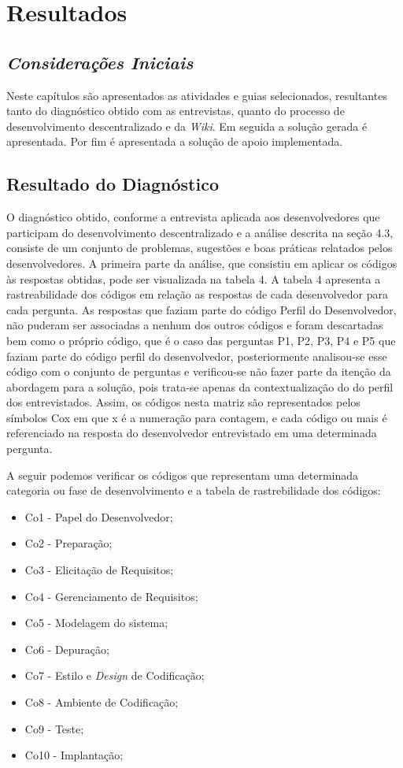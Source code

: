 \chapter[Resultados]{Resultados}

\section{\textit{Considerações Iniciais}}

Neste capítulos são apresentados as atividades e guias selecionados, resultantes tanto do diagnóstico obtido com as entrevistas, quanto do processo de desenvolvimento descentralizado e da \textit{Wiki}. Em seguida a solução gerada é apresentada. Por fim é apresentada a solução de apoio implementada.

\section{Resultado do Diagnóstico}

O diagnóstico obtido, conforme a entrevista aplicada aos desenvolvedores que participam do desenvolvimento descentralizado e a análise descrita na seção 4.3, consiste de um conjunto de problemas, sugestões e boas práticas relatados pelos desenvolvedores. A primeira parte da análise, que consistiu em aplicar os códigos às respostas obtidas, pode ser visualizada na tabela 4. A tabela 4 apresenta a rastreabilidade dos códigos em relação as respostas de cada desenvolvedor para cada pergunta. As respostas que faziam parte do código Perfil do Desenvolvedor, não puderam ser associadas a nenhum dos outros códigos e foram descartadas bem como o próprio código, que é o caso das perguntas P1, P2, P3, P4 e P5 que faziam parte do código perfil do desenvolvedor, posteriormente analisou-se esse código com o conjunto de perguntas e verificou-se não fazer parte da itenção da abordagem para a solução, pois trata-se apenas da contextualização do do perfil dos entrevistados. Assim, os códigos nesta matriz são representados pelos símbolos Cox em que x é a numeração para contagem, e cada código ou mais é referenciado na resposta do desenvolvedor entrevistado em uma determinada pergunta.

A seguir podemos verificar os códigos que representam uma determinada categoria ou fase de desenvolvimento e a tabela de rastrebilidade dos códigos:

\begin{itemize}
\item Co1 - Papel do Desenvolvedor;
\item Co2 - Preparação;
\item Co3 - Elicitação de Requisitos;
\item Co4 - Gerenciamento de Requisitos;
\item Co5 - Modelagem do sistema;
\item Co6 - Depuração;
\item Co7 - Estilo e \textit{Design} de Codificação;
\item Co8 - Ambiente de Codificação;
\item Co9 - Teste;
\item Co10 - Implantação;
\end{itemize}

